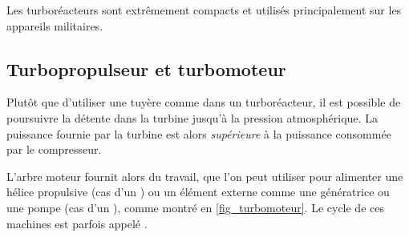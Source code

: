 		Les turboréacteurs sont extrêmement compacts et utilisés principalement sur les appareils militaires.
		

	\subsection{Turbopropulseur et turbomoteur}
	\label{ch_turboprop_turboshaft}

		Plutôt que d’utiliser une tuyère comme dans un turboréacteur, il est possible de poursuivre la détente dans la turbine jusqu’à la pression atmosphérique. La puissance fournie par la turbine est alors \emph{supérieure} à la puissance consommée par le compresseur.

		L’arbre moteur fournit alors du travail, que l’on peut utiliser pour alimenter une hélice propulsive (cas d’un ) ou un élément externe comme une génératrice ou une pompe (cas d’un ), comme montré en \cref{fig_turbomoteur}. Le cycle de ces machines est parfois appelé .

